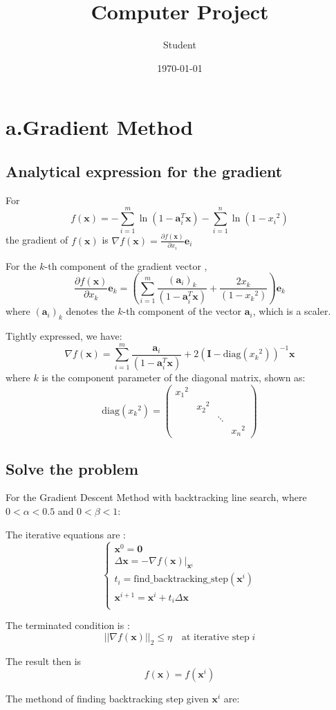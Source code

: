 \documentclass[]{article}
\title{Computer Project}
\author{Student}
\date{\today}
\begin{document}
\maketitle

\section{a.Gradient Method}
\subsection{Analytical expression for the gradient}
For $$f(\mathbf{x}) = -\sum_{i=1}^m\ln(1-\mathbf{a}_i^T\mathbf{x})-\sum_{i=1}^n\ln(1-x_i\phantom{}^2)$$ the gradient of $f(\mathbf{x})$ is $\nabla f(\textbf{x})=\frac{\partial f(\mathbf{x})}{\partial x_i}\mathbf{e}_i$ 
\par For the $k$-th component of the gradient vector , $$\frac{\partial f(\mathbf{x})}{\partial x_k}\mathbf{e}_k = \left(\sum_{i=1}^m\frac{(\textbf{a}_i)_k}{(1-\textbf{a}_i^T\textbf{x})} + \frac{2x_k}{(1-x_k\phantom{}^2)}\right) \textbf{e}_k$$ where $(\textbf{a}_i)_k$ denotes the $k$-th component of the vector $\textbf{a}_i$, which is a scaler. 
\par Tightly expressed, we have:
$$\nabla f(\textbf{x}) = \sum_{i=1}^m\frac{\textbf{a}_i}{(1-\textbf{a}_i^T\textbf{x})}+2(\textbf{I}-\mathrm{diag}(x_k\phantom{}^2))^{-1}\textbf{x}$$ where $k $ is the component parameter of the diagonal matrix, shown as: $$\mathrm{diag} (x_k\phantom{}^2) = \left(\begin{matrix}
x_1\phantom{}^2&&&\\
&x_2\phantom{}^2&&\\
&&\ddots&\\
&&&x_n\phantom{}^2
\end{matrix}\right) $$
\subsection{Solve the problem}
For the Gradient Descent Method with backtracking line search, where $0<\alpha<0.5$ and $0<\beta<1$: 
\par The iterative equations are :
$$\left\{\begin{array}{l}
\textbf{x}^0 = \textbf{0}\\
\Delta \textbf{x} = -\nabla f(\textbf{x})\big|_{\mathbf{x}^i}  \\
t_i = \text{find\_backtracking\_step}(\textbf{x}^i)\\
\textbf{x}^{i+1} = \textbf{x}^i + t_i\Delta \textbf{x}\\
\end{array}\right.$$
\par The terminated condition is :
$$||\nabla f(\textbf{x})||_2\le \eta \quad \text{at iterative step} \; i$$
\par The result then is 
$$f(\textbf{x}) = f(\textbf{x}^i)$$
\par The methond of finding backtracking step given $\textbf{x}^i$ are:
\end{document}
